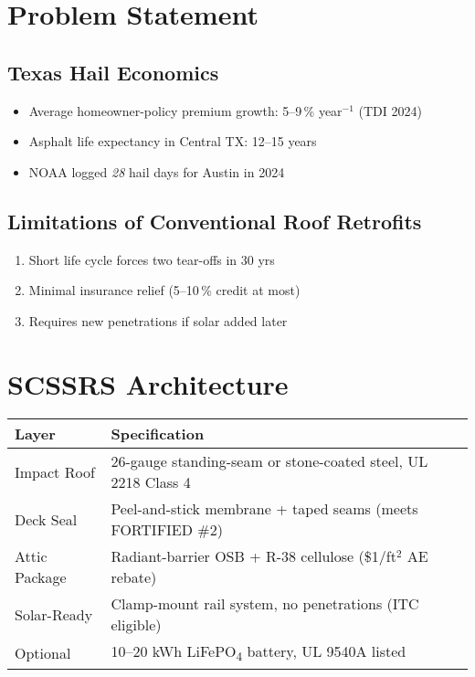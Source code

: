 \documentclass[11pt]{article}
\begin{document}
\section{Problem Statement}

\subsection{Texas Hail Economics}
\begin{itemize}
    \item Average homeowner-policy premium growth: 5–9\,\% year$^{-1}$ (TDI 2024)
    \item Asphalt life expectancy in Central TX: 12–15 years
    \item NOAA logged \textit{28} hail days for Austin in 2024
\end{itemize}

\subsection{Limitations of Conventional Roof Retrofits}
\begin{enumerate}
    \item Short life cycle forces two tear-offs in 30 yrs
    \item Minimal insurance relief (5–10\,\% credit at most)
    \item Requires new penetrations if solar added later
\end{enumerate}

\section{SCSSRS Architecture}

\begin{table}[h]
\centering
\begin{tabular}{@{}ll@{}}
\toprule
\textbf{Layer} & \textbf{Specification} \\ \midrule
Impact Roof    & 26-gauge standing-seam or stone-coated steel, UL 2218 Class 4 \\
Deck Seal      & Peel-and-stick membrane + taped seams (meets FORTIFIED \#2) \\
Attic Package  & Radiant-barrier OSB + R-38 cellulose (\$1/ft$^{2}$ AE rebate) \\
Solar-Ready    & Clamp-mount rail system, no penetrations (ITC eligible) \\
Optional       & 10–20 kWh LiFePO\textsubscript{4} battery, UL 9540A listed \\ \bottomrule
\end{tabular}
\end{table}
\end{document}
